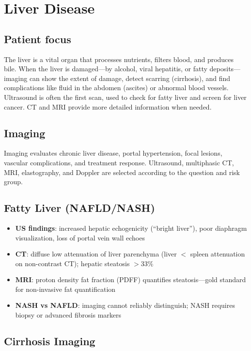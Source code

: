 \chapter{Liver Disease}

\section*{Patient focus}
The liver is a vital organ that processes nutrients, filters blood, and produces bile. When the liver is damaged---by alcohol, viral hepatitis, or fatty deposits---imaging can show the extent of damage, detect scarring (cirrhosis), and find complications like fluid in the abdomen (ascites) or abnormal blood vessels. Ultrasound is often the first scan, used to check for fatty liver and screen for liver cancer. CT and MRI provide more detailed information when needed.


\label{ch:ch64_liver_disease}

\section{Imaging}
Imaging evaluates chronic liver disease, portal hypertension, focal lesions, vascular complications, and treatment response. Ultrasound, multiphasic CT, MRI, elastography, and Doppler are selected according to the question and risk group.

\section{Fatty Liver (NAFLD/NASH)}

\begin{itemize}
  \item \textbf{US findings}: increased hepatic echogenicity (``bright liver''), poor diaphragm visualization, loss of portal vein wall echoes
  \item \textbf{CT}: diffuse low attenuation of liver parenchyma (liver $<$ spleen attenuation on non-contrast CT); hepatic steatosis $>$33\%
  \item \textbf{MRI}: proton density fat fraction (PDFF) quantifies steatosis---gold standard for non-invasive fat quantification
  \item \textbf{NASH vs NAFLD}: imaging cannot reliably distinguish; NASH requires biopsy or advanced fibrosis markers
\end{itemize}

\section{Cirrhosis Imaging}

